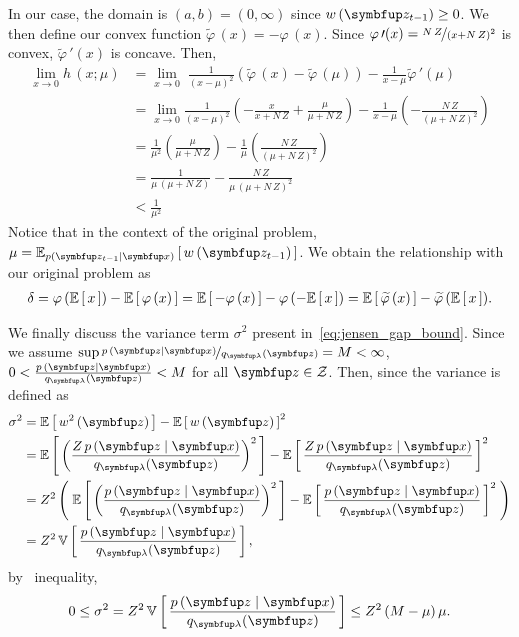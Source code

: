 \begin{proofEnd}
In our case, the domain is \((a,b) = (0, \infty)\) since \(w\,(\vz_{t-1}) \geq 0\).
We then define our convex function \(\widetilde{\varphi}\,(x) = - \varphi\,(x)\).
Since \(\varphi\,\prime(x) = \nicefrac{N\,Z}{{(x + N\,Z)}^2}\) is convex, \(\widetilde{\varphi}\,\prime(x)\) is concave. Then, 
\begin{align}
  \lim_{x \rightarrow 0} h\,(x; \mu)
  &=
  \lim_{x \rightarrow 0} \; \frac{1}{{(x - \mu)}^2} \left( \widetilde{\varphi}\,(x) - \widetilde{\varphi}\,(\mu) \right)
  - \frac{1}{ x - \mu }  \widetilde{\varphi}\,\prime(\mu)  \\
  &=
  \lim_{x \rightarrow 0} \frac{1}{{(x - \mu)}^2}
  \left(
  - \frac{x}{x + N\,Z} + \frac{\mu}{\mu + N\,Z}
  \right)
  -
  \frac{1}{x - \mu}
  \left(
  - \frac{N\,Z}{ {(\mu + N\,Z)}^2 }
  \right) \\
  &= \frac{1}{\mu^2} \left( \frac{\mu}{\mu + N\,Z} \right)
  - \frac{1}{\mu} \left( \frac{N\,Z}{{(\mu + N\,Z)}^2} \right) \\
  &= \frac{1}{ \mu \, (\mu + N\,Z) }
  - \frac{N\,Z}{ \mu \, {(\mu + N\,Z)}^2} \\
  &< \frac{1}{\mu^2}
\end{align}
Notice that in the context of the original problem, \(\mu = \Esub{p(\vz_{t-1}\mid\vx)}{ w\,(\vz_{t-1}) }\).
We obtain the relationship with our original problem as
\begin{align}
  \delta
  = \varphi\,(\mathbb{E}\left[\,x\,\right]) - \mathbb{E}\left[\,\varphi\,(x)\,\right]
  = \mathbb{E}\left[\,-\varphi\,(x)\,\right] - \varphi\,(-\mathbb{E}\left[\,x\,\right])
  = \mathbb{E}\left[\,\widetilde{\varphi}\,(x)\,\right] - \widetilde{\varphi}\,(\mathbb{E}\left[\,x\,\right]).
\end{align}

We finally discuss the variance term \(\sigma^2\) present in~\eqref{eq:jensen_gap_bound}.
Since we assume \(\sup \nicefrac{p\,(\vz\mid\vx)}{q_{\vlambda}(\vz)} = M < \infty \), \( 0 < \frac{p\,(\vz\mid\vx)}{q_{\vlambda}(\vz)} < M \) for all \(\vz \in \mathcal{Z}\).
Then, since the variance is defined as
\begin{align}
    \sigma^2 &= \E{w^2\,(\vz)} - {\E{w\,(\vz)}}^2 \\
             &= \E{ {\left( \frac{Z\,p\,(\vz\mid\vx)}{q_{\vlambda}(\vz) } \right)}^2 } - {\E{\frac{Z\,p\,(\vz\mid\vx)}{q_{\vlambda}(\vz) }}}^2 \\
             &= Z^2 \left(\; \E{ {\left( \frac{p\,(\vz\mid\vx)}{q_{\vlambda}(\vz) } \right)}^2 } - {\E{\frac{p\,(\vz\mid\vx)}{q_{\vlambda}(\vz) }}}^2 \;\right) \\
             &= Z^2 \, \V{ \frac{p\,(\vz\mid\vx)}{q_{\vlambda}(\vz) } } ,
\end{align}
by~\citet{bhatia_better_2000} inequality,
\begin{equation}
    0 \leq \sigma^2 
    = Z^2 \, \V{ \frac{p\,(\vz\mid\vx)}{q_{\vlambda}(\vz) } }
    \leq Z^2 \, (M - \mu)\,\mu.
\end{equation}


\end{proofEnd}
